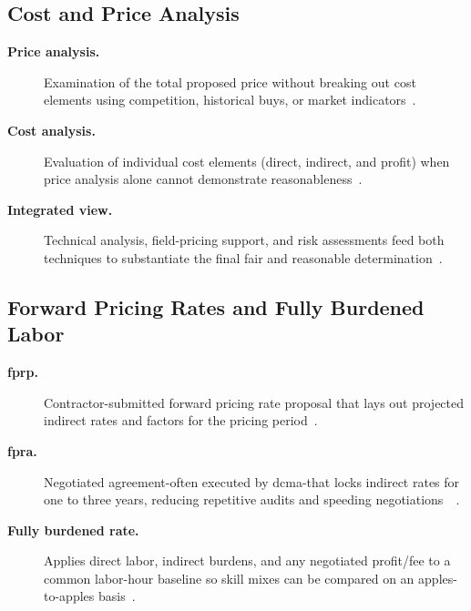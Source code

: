 \documentclass[../main.tex]{subfiles}
\begin{document}
\subsection{Cost and Price Analysis}
\begin{description}
	\item[\textbf{Price analysis.}] Examination of the total proposed price without breaking out cost elements using competition, historical buys, or market indicators~\autocite[\S~15.404-1(b)]{FAR}.
	\item[\textbf{Cost analysis.}] Evaluation of individual cost elements (direct, indirect, and profit) when price analysis alone cannot demonstrate reasonableness~\autocite[\S~15.404-1(c)]{FAR}.
	\item[\textbf{Integrated view.}] Technical analysis, field-pricing support, and risk assessments feed both techniques to substantiate the final fair and reasonable determination~\autocite[\S~15.404-1(a)(5)]{FAR}.
\end{description}

\subsection{Forward Pricing Rates and Fully Burdened Labor}
\begin{description}
	\item[\textbf{\ac{fprp}.}] Contractor-submitted forward pricing rate proposal that lays out projected indirect rates and factors for the pricing period~\autocite[\S~15.407-3(a)]{FAR}.
	\item[\textbf{\ac{fpra}.}] Negotiated agreement-often executed by \ac{dcma}-that locks indirect rates for one to three years, reducing repetitive audits and speeding negotiations~\autocite[\S~15.407-3(c)]{FAR}~\autocite{edo-3-2-4-cost-price-evaluation-2024}.
	\item[\textbf{Fully burdened rate.}] Applies direct labor, indirect burdens, and any negotiated profit/fee to a common labor-hour baseline so skill mixes can be compared on an apples-to-apples basis~\autocite{edo-3-2-4-cost-price-evaluation-2024}.
\end{description}
\end{document}
